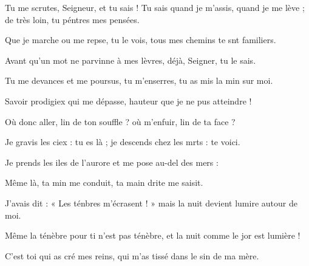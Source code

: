\item Tu me scrutes, Seigneur, et tu sais !\pscross{} Tu sais quand je m’assis, quand je me lève ;\psstar{} de très loin, tu péntres mes pensées.
\item Que je marche ou me repse, tu le vois,\psstar{} tous mes chemins te snt familiers.
\item Avant qu’un mot ne parvinne à mes lèvres,\psstar{} déjà, Seigner, tu le sais.
\item Tu me devances et me poursus, tu m’enserres,\psstar{} tu as mis la min sur moi.
\item Savoir prodigiex qui me dépasse,\psstar{} hauteur que je ne pus atteindre !
\item Où donc aller, lin de ton souffle ?\psstar{} où m’enfuir, lin de ta face ?
\item Je gravis les ciex : tu es là ;\psstar{} je descends chez les mrts : te voici.
\item Je prends les iles de l’aurore\psstar{} et me pose au-del des mers :
\item Même là, ta min me conduit,\psstar{} ta main drite me saisit.
\item J’avais dit : « Les ténbres m’écrasent ! »\psstar{} mais la nuit devient lumire autour de moi.
\item Même la ténèbre pour ti n’est pas ténèbre,\psstar{} et la nuit comme le jor est lumière !
\item C’est toi qui as cré mes reins,\psstar{} qui m’as tissé dans le sin de ma mère.